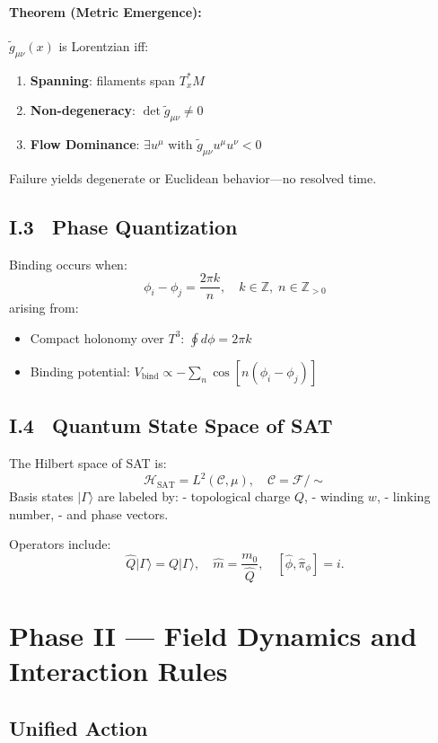 \paragraph{Theorem (Metric Emergence):}
$\tilde g_{\mu\nu}(x)$ is Lorentzian iff:
\begin{enumerate}
  \item \textbf{Spanning}: filaments span $T^*_xM$
  \item \textbf{Non-degeneracy}: $\det\tilde g_{\mu\nu} \neq 0$
  \item \textbf{Flow Dominance}: $\exists u^\mu$ with $\tilde g_{\mu\nu} u^\mu u^\nu < 0$
\end{enumerate}

Failure yields degenerate or Euclidean behavior—no resolved time.

\subsection{I.3~ Phase Quantization}

Binding occurs when:
\[
   \phi_i - \phi_j = \frac{2\pi k}{n},\quad k \in \mathbb{Z},\; n \in \mathbb{Z}_{>0}
\]
arising from:
\begin{itemize}
  \item Compact holonomy over $T^3$: $\oint d\phi = 2\pi k$
  \item Binding potential: $V_{\text{bind}} \propto -\sum_n \cos[n(\phi_i - \phi_j)]$
\end{itemize}

\subsection{I.4~ Quantum State Space of SAT}

The Hilbert space of SAT is:
\[
    \mathcal H_{\text{SAT}} = L^2(\mathcal C, \mu),\quad \mathcal C = \mathcal F/\sim
\]
Basis states $|\Gamma\rangle$ are labeled by:
- topological charge $Q$,
- winding $w$,
- linking number,
- and phase vectors.

Operators include:
\[
\hat Q|\Gamma\rangle = Q|\Gamma\rangle,\quad \hat m = \frac{m_0}{\hat Q},\quad [\hat\phi,\hat\pi_\phi] = i.
\]

\section{Phase II — Field Dynamics and Interaction Rules}

\subsection{Unified Action}

